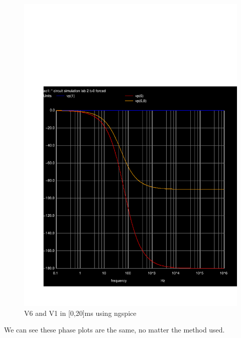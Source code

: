   \begin{figure}[H] \centering
\includegraphics[width=0.4\linewidth]{../sim/phs.pdf}
\caption{V6 and V1 in [0,20]ms using ngspice}
\label{fig:ff}
\end{figure}
We can see these phase plots are the same, no matter the method used.
